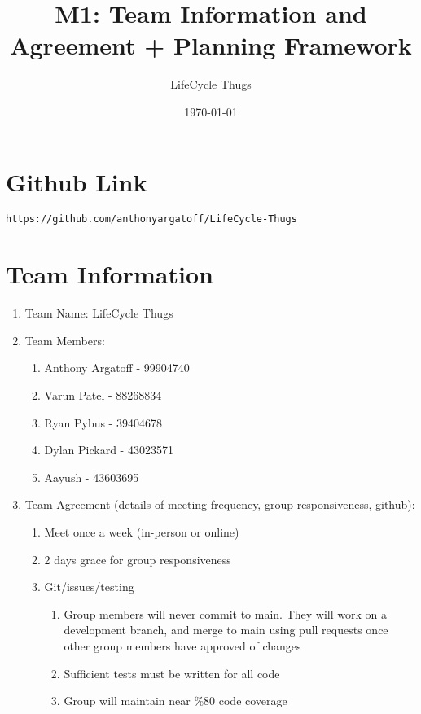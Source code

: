 \documentclass{article}
\title{M1: Team Information and Agreement + Planning Framework}
\author{LifeCycle Thugs}
\date{\today}
\begin{document}
\maketitle

\section*{Github Link}
\begin{verbatim}
https://github.com/anthonyargatoff/LifeCycle-Thugs
\end{verbatim}

\section*{Team Information}
\begin{enumerate}
    \item Team Name: LifeCycle Thugs
    \item Team Members:
        \begin{enumerate}
            \item Anthony Argatoff - 99904740
            \item Varun Patel - 88268834
            \item Ryan Pybus - 39404678
            \item Dylan Pickard - 43023571
            \item Aayush - 43603695
        \end{enumerate}
    \item Team Agreement (details of meeting frequency, group responsiveness, github):
        \begin{enumerate}
            \item Meet once a week (in-person or online)
            \item 2 days grace for group responsiveness
            \item Git/issues/testing
            \begin{enumerate}
                \item Group members will never commit to main. They will work on a development branch, and merge to main using pull requests once other group members have approved of changes
                \item Sufficient tests must be written for all code
                \item Group will maintain near \%80 code coverage
            \end{enumerate}
        \end{enumerate}

\end{enumerate}
\end{document}
